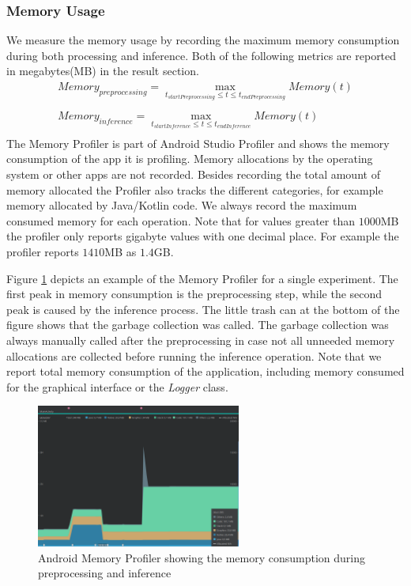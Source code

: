 \subsubsection{Memory Usage}
We measure the memory usage by recording the maximum memory consumption during both processing and inference. Both of the following metrics are reported in megabytes(MB) in the result section.
\begin{equation*}
\begin{gathered}
Memory_{preprocessing} = \max\limits_{t_{startPreprocessing} \leq t \leq t_{endPreprocessing}} Memory(t)\\\\
Memory_{inference} = \max\limits_{t_{startInference} \leq t \leq t_{endInference}} Memory(t)\\
\end{gathered}
\end{equation*}
The Memory Profiler is part of Android Studio Profiler and shows the memory consumption of the app it is profiling. Memory allocations by the operating system or other apps are not recorded. Besides recording the total amount of memory allocated the Profiler also tracks the different categories, for example memory allocated by Java/Kotlin code. We always record the maximum consumed memory for each operation.
Note that for values greater than $1000$MB the profiler only reports gigabyte values with one decimal place. For example the profiler reports $1410$MB as $1.4$GB.

Figure \ref{fig:prof_mem} depicts an example of the Memory Profiler for a single experiment. The first peak in memory consumption is the preprocessing step, while the second peak is caused by the inference process.
The little trash can at the bottom of the figure shows that the garbage collection was called. The garbage collection was always manually called after the preprocessing in case not all unneeded memory allocations are collected before running the inference operation. 
Note that we report total memory consumption of the application, including memory consumed for the graphical interface or the \emph{Logger} class.
\begin{figure}[H]
\centering
\includegraphics[width=0.6\textwidth]{./Bilder/profiler_MEM}
\caption{Android Memory Profiler showing the memory consumption during preprocessing and inference}
\label{fig:prof_mem}
\end{figure}
